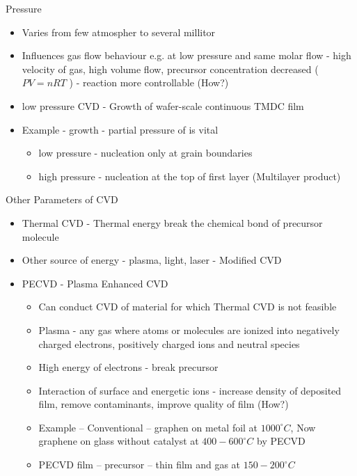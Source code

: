 \documentclass{beamer}
\begin{document}
\begin{frame}{Pressure}
    \begin{itemize}
        \item Varies from few atmospher to several millitor
        \item Influences gas flow behaviour e.g. at low pressure and same molar flow - high velocity of gas, high volume flow, precursor concentration decreased ( $PV = nRT$ ) - reaction more controllable (How?)
        \item low pressure CVD - Growth of wafer-scale continuous TMDC film
        \item Example -  growth - partial pressure of  is vital
        \begin{itemize}
            \item low pressure - nucleation only at grain boundaries
            \item high pressure - nucleation at the top of first layer (Multilayer product)
        \end{itemize}
    \end{itemize}
\end{frame}

\begin{frame}{Other Parameters of CVD}
    \begin{itemize}
        \item Thermal CVD - Thermal energy break the chemical bond of precursor molecule
        \item Other source of energy - plasma, light, laser - Modified CVD
        \item PECVD - Plasma Enhanced CVD
        \begin{itemize}
            \item Can conduct CVD of material for which Thermal CVD is not feasible
            \item Plasma - any gas where atoms or molecules are ionized into negatively charged electrons, positively charged ions and neutral species
            \item High energy of electrons - break precursor
            \item Interaction of surface and energetic ions - increase density of deposited film, remove contaminants, improve quality of film (How?)
            \item Example -- Conventional -- graphen on metal foil at $1000^{\circ}C$, Now graphene on glass without catalyst at $400-600^{\circ}C$ by PECVD
            \item PECVD  film -- precursor --  thin film and  gas at $150-200^{\circ}C$
        \end{itemize}
    \end{itemize}
\end{frame}
\end{document}

